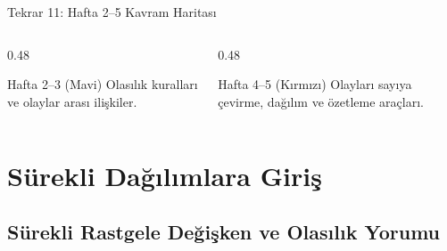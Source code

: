 \documentclass[light]{lutbeamer}
\begin{document}
\begin{frame}{Tekrar 11: Hafta 2--5 Kavram Haritası}

    \vspace{0.3cm}
    \begin{columns}[T]
        \begin{column}{0.48\textwidth}
            \begin{block}{Hafta 2--3 (Mavi)}
                Olasılık kuralları ve olaylar arası ilişkiler.
            \end{block}
        \end{column}
        \begin{column}{0.48\textwidth}
            \begin{block}{Hafta 4--5 (Kırmızı)}
                Olayları sayıya çevirme, dağılım ve özetleme araçları.
            \end{block}
        \end{column}
    \end{columns}
\end{frame}


\section{Sürekli Dağılımlara Giriş}
\subsection{Sürekli Rastgele Değişken ve Olasılık Yorumu}
\end{document}
